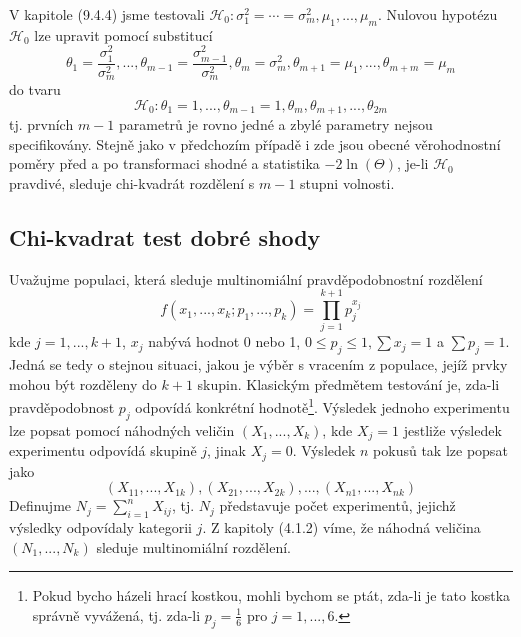 \begin{example}
V kapitole (9.4.4) jsme testovali $\mathscr{H}_0: \sigma_1^2 = \cdots = \sigma_m^2, \mu_1, ..., \mu_m$. Nulovou hypotézu $\mathscr{H}_0$ lze upravit pomocí substitucí
\begin{equation*}
\theta_1 = \frac{\sigma_1^2}{\sigma_m^2}, ..., \theta_{m - 1} = \frac{\sigma_{m - 1}^2}{\sigma_m^2}, \theta_m = \sigma_m^2, \theta_{m + 1} = \mu_1, ..., \theta_{m + m} = \mu_m
\end{equation*}
do tvaru
\begin{equation*}
\mathscr{H}_0: \theta_1 = 1, ..., \theta_{m - 1} = 1, \theta_m, \theta_{m + 1}, ..., \theta_{2m}
\end{equation*}
tj. prvních $m - 1$ parametrů je rovno jedné a zbylé parametry nejsou specifikovány. Stejně jako v předchozím případě i zde jsou obecné věrohodnostní poměry před a po transformaci shodné a statistika $-2 \ln(\Theta)$, je-li $\mathscr{H}_0$ pravdivé, sleduje chi-kvadrát rozdělení s $m - 1$ stupni volnosti.
\end{example}

\subsection{Chi-kvadrat test dobré shody}

Uvažujme populaci, která sleduje multinomiální pravděpodobnostní rozdělení
\begin{equation*}
f(x_1, ..., x_k; p_1, ..., p_k) = \prod_{j = 1}^{k + 1}p_j^{x_j}
\end{equation*}
kde $j = 1, ..., k + 1$, $x_j$ nabývá hodnot 0 nebo 1, $0 \le p_j \le 1, \sum x_j = 1$ a $\sum p_j = 1$. Jedná se tedy o stejnou situaci, jakou je výběr s vracením z populace, jejíž prvky mohou být rozděleny do $k + 1$ skupin. Klasickým předmětem testování je, zda-li pravděpodobnost $p_j$ odpovídá konkrétní hodnotě\footnote{Pokud bycho házeli hrací kostkou, mohli bychom se ptát, zda-li je tato kostka správně vyvážená, tj. zda-li $p_j = \frac{1}{6}$ pro $j = 1, ..., 6$.}. Výsledek jednoho experimentu lze popsat pomocí náhodných veličin $(X_1, ..., X_k)$, kde $X_j = 1$ jestliže výsledek experimentu odpovídá skupině $j$, jinak $X_j = 0$. Výsledek $n$ pokusů tak lze popsat jako
\begin{equation*}
(X_{11}, ..., X_{1k}), (X_{21}, ..., X_{2k}), ..., (X_{n1}, ..., X_{nk})
\end{equation*}
Definujme $N_j = \sum_{i = 1}^n X_{ij}$, tj. $N_j$ představuje počet experimentů, jejichž výsledky odpovídaly kategorii $j$. Z kapitoly (4.1.2) víme, že náhodná veličina $(N_1, ..., N_k)$ sleduje multinomiální rozdělení.

